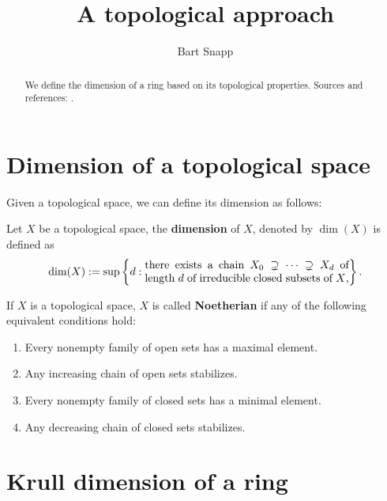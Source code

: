 \documentclass{ximera}
\author{Bart Snapp}
\title{A topological approach}
\begin{document}
\begin{abstract}
  We define the dimension of a ring based on its topological
  properties.  Sources and references: \cite{sD2008}.
\end{abstract}
\maketitle

\section{Dimension of a topological space}

Given a topological space, we can define its dimension as follows:


\begin{definition}
  Let $X$ be a topological space, the \textbf{dimension} of $X$,
  denoted by $\dim(X)$ is defined as
  \[
  \dim(X) :=\sup\left\{d:
  \begin{minipage}{43ex}
    there exists a chain $X_0\supsetneq \dots \supsetneq X_d$ of
    length $d$ of irreducible closed subsets of $X$,
  \end{minipage}
  \right\}.
  \]
\end{definition}


\begin{definition}
  If $X$ is a topological space, $X$ is called \textbf{Noetherian} if
  any of the following equivalent conditions hold:
  \begin{enumerate}
  \item Every nonempty family of open sets has a maximal element.
  \item Any increasing chain of open sets stabilizes.
  \item Every nonempty family of closed sets has a minimal element.
  \item Any decreasing chain of closed sets stabilizes.
  \end{enumerate}
\end{definition}




\section{Krull dimension of a ring}
\end{document}

